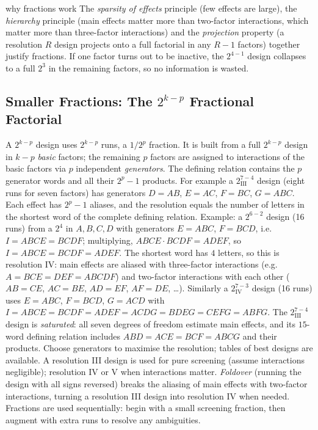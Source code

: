 \begin{interview}{why fractions work}
The \emph{sparsity of effects} principle (few effects are large), the \emph{hierarchy} principle (main effects matter more than two-factor interactions, which matter more than three-factor interactions) and the \emph{projection} property (a resolution $R$ design projects onto a full factorial in any $R-1$ factors) together justify fractions. If one factor turns out to be inactive, the $2^{4-1}$ design collapses to a full $2^3$ in the remaining factors, so no information is wasted.
\end{interview}

\subsection{Smaller Fractions: The $2^{k-p}$ Fractional Factorial}

A $2^{k-p}$ design uses $2^{k-p}$ runs, a $1/2^p$ fraction. It is built from a full $2^{k-p}$ design in $k-p$ \emph{basic} factors; the remaining $p$ factors are assigned to interactions of the basic factors via $p$ independent \emph{generators}. The defining relation contains the $p$ generator words and all their $2^p-1$ products. For example a $2^{7-4}_{\mathrm{III}}$ design (eight runs for seven factors) has generators $D=AB$, $E=AC$, $F=BC$, $G=ABC$. Each effect has $2^p-1$ aliases, and the resolution equals the number of letters in the shortest word of the complete defining relation. Example: a $2^{6-2}$ design (16 runs) from a $2^4$ in $A,B,C,D$ with generators $E=ABC$, $F=BCD$, i.e.\ $I=ABCE=BCDF$; multiplying, $ABCE\cdot BCDF=ADEF$, so $I=ABCE=BCDF=ADEF$. The shortest word has $4$ letters, so this is resolution IV: main effects are aliased with three-factor interactions (e.g.\ $A=BCE=DEF=ABCDF$) and two-factor interactions with each other ($AB=CE$, $AC=BE$, $AD=EF$, $AF=DE$, \dots). Similarly a $2^{7-3}_{\mathrm{IV}}$ design (16 runs) uses $E=ABC$, $F=BCD$, $G=ACD$ with $I=ABCE=BCDF=ADEF=ACDG=BDEG=CEFG=ABFG$. The $2^{7-4}_{\mathrm{III}}$ design is \emph{saturated}: all seven degrees of freedom estimate main effects, and its $15$-word defining relation includes $ABD=ACE=BCF=ABCG$ and their products. Choose generators to maximise the resolution; tables of best designs are available. A resolution III design is used for pure screening (assume interactions negligible); resolution IV or V when interactions matter. \emph{Foldover} (running the design with all signs reversed) breaks the aliasing of main effects with two-factor interactions, turning a resolution III design into resolution IV when needed. Fractions are used sequentially: begin with a small screening fraction, then augment with extra runs to resolve any ambiguities.

